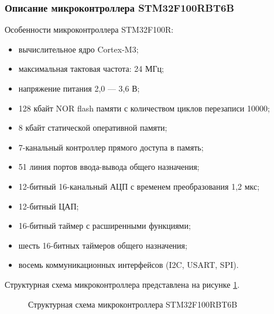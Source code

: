     \subsubsection{Описание микроконтроллера STM32F100RBT6B}
        Особенности микроконтроллера STM32F100R:
        \begin{itemize}
            \item вычислительное ядро Cortex-M3;
            \item максимальная тактовая частота: 24 МГц;
            \item напряжение питания 2,0 — 3,6 В;
            \item 128 кбайт NOR flash памяти с количеством циклов перезаписи 10000;
            \item 8 кбайт статической оперативной памяти;
            \item 7-канальный контроллер прямого доступа в память;
            \item 51 линия портов ввода-вывода общего назначения;
            \item 12-битный 16-канальный АЦП с временем преобразования 1,2 мкс;
            \item 12-битный ЦАП;
            \item 16-битный таймер с расширенными функциями;
            \item шесть 16-битных таймеров общего назначения;
            \item восемь коммуникационных интерфейсов (I2C, USART, SPI).
        \end{itemize}

        Структурная схема микроконтроллера представлена на рисунке
        \ref{fig:stm32f100rbt6b}.

        \begin{figure}
            \caption{Структурная схема микроконтроллера STM32F100RBT6B}
            \label{fig:stm32f100rbt6b}
        \end{figure}       
        
